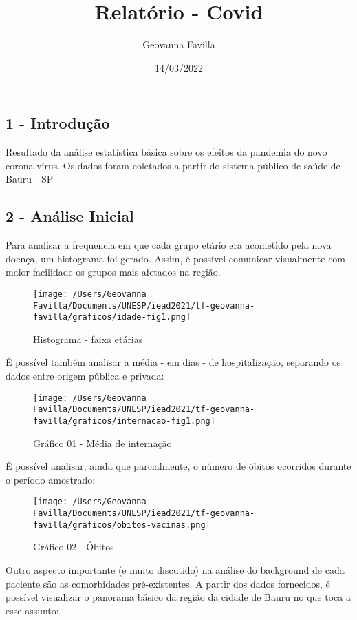 \documentclass[
]{article}
\title{Relatório - Covid}
\author{Geovanna Favilla}
\date{14/03/2022}
\begin{document}
\maketitle

\hypertarget{introduuxe7uxe3o}{%
\subsection{1 - Introdução}\label{introduuxe7uxe3o}}

Resultado da análise estatística básica sobre os efeitos da pandemia do
novo corona vírus. Os dados foram coletados a partir do sistema público
de saúde de Bauru - SP

\hypertarget{anuxe1lise-inicial}{%
\subsection{2 - Análise Inicial}\label{anuxe1lise-inicial}}

Para analisar a frequencia em que cada grupo etário era acometido pela
nova doença, um histograma foi gerado. Assim, é possível comunicar
visualmente com maior facilidade os grupos mais afetados na região.

\begin{figure}
\centering
\texttt{[image: /Users/Geovanna Favilla/Documents/UNESP/iead2021/tf-geovanna-favilla/graficos/idade-fig1.png]}
\caption{Histograma - faixa etárias}
\end{figure}

É possível também analisar a média - em dias - de hospitalização,
separando os dados entre origem pública e privada:

\begin{figure}
\centering
\texttt{[image: /Users/Geovanna Favilla/Documents/UNESP/iead2021/tf-geovanna-favilla/graficos/internacao-fig1.png]}
\caption{Gráfico 01 - Média de internação}
\end{figure}

É possível analisar, ainda que parcialmente, o número de óbitos
ocorridos durante o período amostrado:

\begin{figure}
\centering
\texttt{[image: /Users/Geovanna Favilla/Documents/UNESP/iead2021/tf-geovanna-favilla/graficos/obitos-vacinas.png]}
\caption{Gráfico 02 - Óbitos}
\end{figure}

Outro aspecto importante (e muito discutido) na análise do background de
cada paciente são as comorbidades pré-existentes. A partir dos dados
fornecidos, é possível visualizar o panorama básico da região da cidade
de Bauru no que toca a esse assunto:
\end{document}
